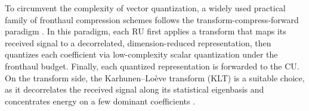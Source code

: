 \documentclass[10pt, twocolumn, comsoc]{IEEEtran}
\begin{document}

To circumvent the complexity of vector quantization, a widely used practical family of fronthaul compression schemes follows the transform-compress-forward paradigm \cite{liu2015optimized, liu2019twotimescale, zhang2021quantization, qiao2024meta}.
In this paradigm, each RU first applies a transform that maps its received signal to a decorrelated, dimension-reduced representation, then quantizes each coefficient via low-complexity scalar quantization under the fronthaul budget. 
Finally, each quantized representation is forwarded to the CU. 
On the transform side, the Karhunen--Lo\`eve transform (KLT) is a suitable choice, as it decorrelates the received signal along its statistical eigenbasis and concentrates energy on a few dominant coefficients \cite{liu2015optimized, wiffen2020dimension, wiffen2021distributed}.



\end{document}
